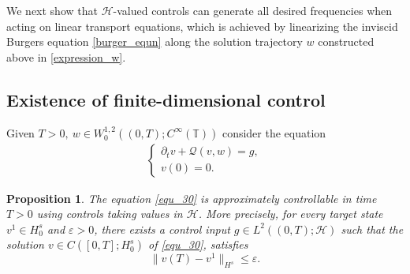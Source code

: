 \documentclass[10pt, reqno]{amsart}
\newtheorem{proposition}{Proposition} [section]
\numberwithin{equation}{section}
\begin{document}
We next show that $\mathcal{H}$-valued controls can generate all desired frequencies when acting on linear transport equations, which is achieved by linearizing the inviscid Burgers equation \eqref{burger_equn} along the solution trajectory $w$ constructed above in \eqref{expression_w}.

\subsection{Existence of finite-dimensional control} Given $T > 0, \ w \in W_0^{1,2}((0,T);C^\infty(\mathbb{T}))$ consider the equation
\begin{align}\label{equ_30}
\begin{cases}
	\partial_t v + \mathcal{Q}(v, w) = g,\\
	v(0) = 0.
\end{cases}
\end{align}
\begin{proposition}\label{prpn_approx_linear_equn}
The equation \eqref{equ_30} is approximately controllable in time \( T > 0 \) using controls taking values in \( \mathcal{H} \). More precisely, for every target state \( v^1 \in H^{s}_0 \) and \( \varepsilon > 0 \), there exists a control input \( g \in L^2((0, T); \mathcal{H}) \) such that the solution $v \in C([0, T]; H^{s}_0)$ of  \eqref{equ_30}, satisfies 
	\[
	\|v(T) - v^1\|_{H^s} \leq \varepsilon.
	\]
\end{proposition}
\end{document}
